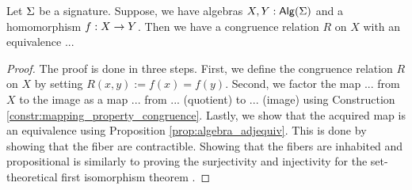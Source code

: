 \begin{theorem}
Let $\Sigma$ be a signature.
Suppose, we have algebras $X, Y : \mathsf{Alg}(\Sigma)$ and a homomorphism $f : X \rightarrow Y$.
Then we have a congruence relation $R$ on $X$ with an equivalence ... 
\end{theorem}

\begin{proof}
The proof is done in three steps.
First, we define the congruence relation $R$ on $X$ by setting $R(x, y) := f(x) = f(y)$.
Second, we factor the map ... from $X$ to the image as a map ... from ... (quotient) to ... (image) using Construction \ref{constr:mapping_property_congruence}.
Lastly, we show that the acquired map is an equivalence using Proposition \ref{prop:algebra_adjequiv}.
This is done by showing that the fiber are contractible.
Showing that the fibers are inhabited and propositional is similarly to proving the surjectivity and injectivity for the set-theoretical first isomorphism theorem \cite{lynge2019}.
\end{proof}
